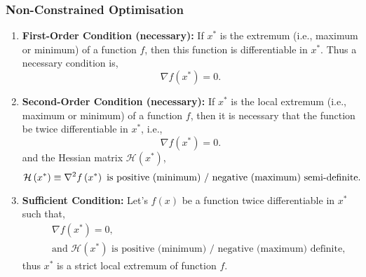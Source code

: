\subsubsection{Non-Constrained Optimisation}
  \begin{enumerate}[{\bf i)}]
      \item {\bf First-Order Condition (necessary):} If $x^{\ast}$ is the extremum (i.e., maximum or minimum) of a function $f$, then this function is differentiable in $x^{\ast}$. Thus a necessary condition is,
          \begin{displaymath}
             \nabla f\left(x^{\ast}\right) = 0.
          \end{displaymath}
      \item  {\bf Second-Order Condition (necessary):} If $x^{\ast}$ is the local extremum (i.e., maximum or minimum) of a function $f$, then it is necessary that the function be twice differentiable in $x^{\ast}$, i.e.,
          \begin{displaymath}
             \nabla f\left(x^{\ast}\right) = 0.
          \end{displaymath}
and the Hessian matrix $\mathcal{H}\left(x^{\ast}\right)$,
          \begin{displaymath}
             \mathcal{H}\left(x^{\ast}\right) \equiv \nabla^{2} f\left(x^{\ast}\right) \text{ is positive (minimum) / negative (maximum) semi-definite}.\index{Hessian matrix ! Conditions of optimality}
          \end{displaymath}
      \item {\bf Sufficient Condition:} Let's $f(x)$ be a function twice differentiable in $x^{\ast}$ such that,
          \begin{eqnarray}
             &&\nabla f\left(x^{\ast}\right) = 0, \nonumber \\
             && \text{and } \mathcal{H}\left(x^{\ast}\right) \text{ is positive (minimum) / negative (maximum) definite,} \nonumber 
          \end{eqnarray}
           thus $x^{\ast}$ is a strict local extremum of function $f$.
  \end{enumerate}

